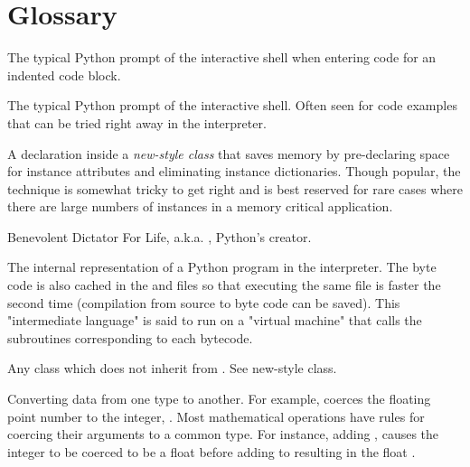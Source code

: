 \chapter{Glossary\label{glossary}}


\begin{description}

\item[...]{The typical Python prompt of the interactive shell when entering
code for an indented code block.}

\index{>>>}
\item[>>>]{The typical Python prompt of the interactive shell.  Often seen
for code examples that can be tried right away in the interpreter.}

\item[__slots__]{A declaration inside a \emph{new-style class} that saves
memory by pre-declaring space for instance attributes and eliminating
instance dictionaries.  Though popular, the technique is somewhat tricky to
get right and is best reserved for rare cases where there are large numbers
of instances in a memory critical application.}

\item[BDFL]{Benevolent Dictator For Life, a.k.a. , Python's creator.}

\item[byte code]{The internal representation of a Python program in the
interpreter.  The byte code is also cached in the  and
{} files so that executing the same file is faster the second
time (compilation from source to byte code can be saved).  This
"intermediate language" is said to run on a "virtual machine" that calls the
subroutines corresponding to each bytecode.}

\item[classic class]{Any class which does not inherit from .
See new-style class.}

\item[coercion]{Converting data from one type to another.  For example,
{} coerces the floating point number to the integer, .
Most mathematical operations have rules for coercing their arguments to a common
type.  For instance, adding , causes the integer  to be
coerced to be a float  before adding to  resulting in the
float .}


\end{description}
